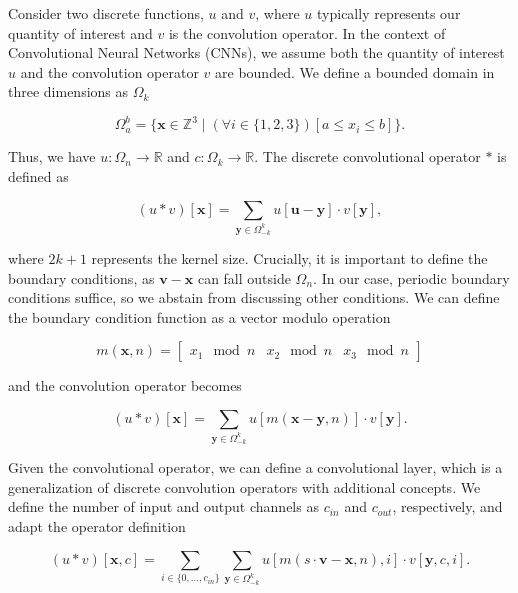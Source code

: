 \documentclass{article}
\begin{document}
Consider two discrete functions, $u$ and $v$, where $u$ typically represents our quantity of interest and $v$ is the convolution operator. In the context of Convolutional Neural Networks (CNNs), we assume both the quantity of interest $u$ and the convolution operator $v$ are bounded. We define a bounded domain in three dimensions as $\Omega_k$

\begin{equation}
\label{eq:bounded-domain}
    \Omega_{a}^{b} = \{ \mathbf{x} \in \mathbb{Z}^3 \mid (\forall i \in \{1, 2, 3\}) [a \leq x_i \leq b] \}.
\end{equation}

Thus, we have \( u \colon \Omega_n \rightarrow \mathbb{R} \) and \( c \colon \Omega_k \rightarrow \mathbb{R} \). The discrete convolutional operator \(\ast\) is defined as

\begin{equation}
    (u \ast v)[\mathbf{x}] = \sum_{\mathbf{y} \in \Omega_{-k}^{k}} u[\mathbf{u} - \mathbf{y}] \cdot v[\mathbf{y}],
\end{equation}

where \(2k + 1\) represents the kernel size. Crucially, it is important to define the boundary conditions, as \(\mathbf{v} - \mathbf{x}\) can fall outside \(\Omega_n\). In our case, periodic boundary conditions suffice, so we abstain from discussing other conditions. We can define the boundary condition function as a vector modulo operation

\begin{equation}
    m(\mathbf{x}, n) = \begin{bmatrix}
        x_1 \mod n & x_2 \mod n & x_3 \mod n
    \end{bmatrix}
\end{equation}

and the convolution operator becomes 

\begin{equation}
    (u \ast v)[\mathbf{x}] = \sum_{\mathbf{y} \in \Omega_{-k}^{k}} u\left[m(\mathbf{x} - \mathbf{y}, n)\right] \cdot v[\mathbf{y}].
\end{equation}

Given the convolutional operator, we can define a convolutional layer, which is a generalization of discrete convolution operators with additional concepts. We define the number of input and output channels as $c_{in}$ and $c_{out}$, respectively, and adapt the operator definition

\begin{equation}
    (u \ast v)[\mathbf{x}, c] = \sum_{i \in \{0, \dots, c_{in}\}} \sum_{\mathbf{y} \in \Omega_{-k}^{k}} u\left[m(s \cdot \mathbf{v} - \mathbf{x}, n), i\right] \cdot v[\mathbf{y}, c, i].
\end{equation}
\end{document}
